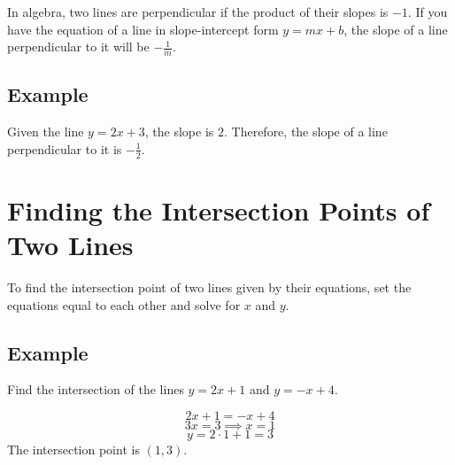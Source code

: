 \documentclass[12pt]{article}
\begin{document}
In algebra, two lines are perpendicular if the product of their slopes is \(-1\). If you have the equation of a line in slope-intercept form \(y = mx + b\), the slope of a line perpendicular to it will be \(-\frac{1}{m}\).\\

\subsection*{Example}

Given the line \(y = 2x + 3\), the slope is \(2\). Therefore, the slope of a line perpendicular to it is \(-\frac{1}{2}\).

\begin{center}
\end{center}

\newpage

\section*{Finding the Intersection Points of Two Lines}

To find the intersection point of two lines given by their equations, set the equations equal to each other and solve for \(x\) and \(y\).

\subsection*{Example}

Find the intersection of the lines \(y = 2x + 1\) and \(y = -x + 4\).

\[
2x + 1 = -x + 4
\]
\[
3x = 3 \implies x = 1
\]
\[
y = 2\cdot1 + 1 = 3
\]
The intersection point is \((1, 3)\).\\
\end{document}
